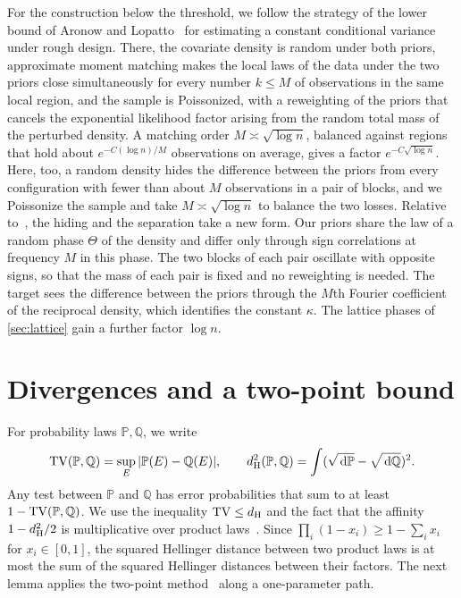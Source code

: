 For the construction below the threshold, we follow the strategy of the
lower bound of Aronow and Lopatto~\cite[Section~1.2]{aronowlopatto} for
estimating a constant conditional variance under rough design. There,
the covariate density is random under both priors, approximate moment
matching makes the local laws of the data under the two priors close
simultaneously for every number $k\le M$ of observations in the same
local region, and the sample is Poissonized, with a reweighting of
the priors that cancels the exponential likelihood factor arising from
the random total mass of the perturbed density.
A matching order $M\asymp\sqrt{\log n}$, balanced against regions that
hold about $e^{-C(\log n)/M}$ observations on average, gives a factor
$e^{-C\sqrt{\log n}}$. Here, too, a random density hides the
difference between the priors from every configuration with fewer than
about $M$ observations in a pair of blocks, and we Poissonize the sample
and take $M\asymp\sqrt{\log n}$ to balance the two losses. Relative to~\cite{aronowlopatto}, the hiding and the separation take a
new form. Our priors share the law of a
random phase $\Theta$ of the density and differ only through sign
correlations at frequency $M$ in this phase. The two blocks of each pair
oscillate with opposite signs, so that the mass of each pair is fixed
and no reweighting is needed. The target sees the difference between the
priors through the $M$th Fourier coefficient of the reciprocal density,
which identifies the constant $\kappa$. The lattice phases of
\cref{sec:lattice} gain a further factor $\log n$.

\section{Divergences and a two-point bound}\label{sec:two-point}

For probability laws $\mathbb P,\mathbb Q$, we write
\[
 \operatorname{TV}(\mathbb P,\mathbb Q)=\sup_E|\mathbb P(E)-\mathbb Q(E)|,\qquad
 d_{\rm H}^2(\mathbb P,\mathbb Q)
 =\int(\sqrt{\,\mathrm d\mathbb P}-\sqrt{\,\mathrm d\mathbb Q})^2 .
\]
Any test between $\mathbb P$ and $\mathbb Q$ has error probabilities
that sum to at least $1-\operatorname{TV}(\mathbb P,\mathbb Q)$. We use the
inequality $\operatorname{TV}\le d_{\rm H}$ and the fact that the affinity
$1-d_{\rm H}^2/2$ is multiplicative over product
laws~\cite[Section~2.4 and Lemma~2.3]{tsybakov}. Since
$\prod_i(1-x_i)\ge1-\sum_ix_i$ for $x_i\in[0,1]$, the squared Hellinger
distance between two product laws is at most the sum of the squared
Hellinger distances between their factors. The next lemma applies the
two-point method~\cite[Sections~2.3 and~2.4.2]{tsybakov} along a
one-parameter path.

